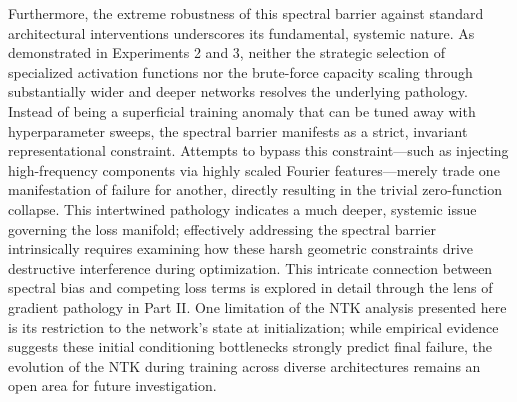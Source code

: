 Furthermore, the extreme robustness of this spectral barrier against standard architectural interventions underscores its fundamental, systemic nature. As demonstrated in Experiments 2 and 3, neither the strategic selection of specialized activation functions nor the brute-force capacity scaling through substantially wider and deeper networks resolves the underlying pathology. Instead of being a superficial training anomaly that can be tuned away with hyperparameter sweeps, the spectral barrier manifests as a strict, invariant representational constraint. Attempts to bypass this constraint—such as injecting high-frequency components via highly scaled Fourier features—merely trade one manifestation of failure for another, directly resulting in the trivial zero-function collapse. This intertwined pathology indicates a much deeper, systemic issue governing the loss manifold; effectively addressing the spectral barrier intrinsically requires examining how these harsh geometric constraints drive destructive interference during optimization. This intricate connection between spectral bias and competing loss terms is explored in detail through the lens of gradient pathology in Part II. One limitation of the NTK analysis presented here is its restriction to the network's state at initialization; while empirical evidence suggests these initial conditioning bottlenecks strongly predict final failure, the evolution of the NTK during training across diverse architectures remains an open area for future investigation.
